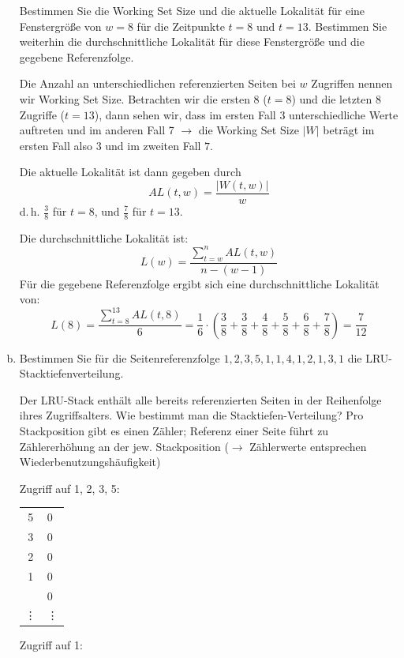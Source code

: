 \begin{enumerate}[a)]
Bestimmen Sie die Working Set Size und die aktuelle Lokalität für eine Fenstergröße von \(w = 8\) für die Zeitpunkte \(t=8\) und \(t=13\).
Bestimmen Sie weiterhin die durchschnittliche Lokalität für diese Fenstergröße und die gegebene Referenzfolge.

\begin{solution}
Die Anzahl an unterschiedlichen referenzierten Seiten bei $w$ Zugriffen nennen wir Working Set Size. Betrachten wir  die ersten 8 (\(t=8\)) und die letzten 8 Zugriffe (\(t=13\)), dann sehen wir, dass im ersten Fall 3 unterschiedliche Werte auftreten und im anderen Fall 7 $\rightarrow$ die Working Set Size $|W|$ beträgt im ersten Fall also $3$ und im zweiten Fall $7$.

Die aktuelle Lokalität ist dann gegeben durch	\[AL(t, w) = \frac{|W(t, w)|}{w}\] d.\,h. $\frac{3}{8}$
für \(t=8\), und $\frac{7}{8}$ für \(t=13\).

Die durchschnittliche Lokalität ist: \[L(w) = \frac{\sum_{t = w}^n AL(t, w)}{n-(w-1)}\]
Für die gegebene Referenzfolge ergibt sich eine durchschnittliche Lokalität von:
\begin{equation*}
	 L(8) = \frac{\sum_{t = 8}^{13} AL(t, 8)}{6} = \frac{1}{6} \cdot (\frac{3}{8}+\frac{3}{8}+\frac{4}{8}+\frac{5}{8}+\frac{6}{8}+\frac{7}{8}) = \frac{7}{12}
\end{equation*}

\end{solution}

    \item Bestimmen Sie für die Seitenreferenzfolge $1, 2, 3, 5, 1, 1, 4, 1, 2, 1, 3, 1$ die LRU-Stack\-tie\-fen\-ver\-tei\-lung.

\begin{solution}
Der LRU-Stack enthält alle bereits referenzierten Seiten in der Reihenfolge ihres Zugriffsalters. Wie bestimmt man die Stacktiefen-Verteilung? Pro Stackposition gibt es einen Zähler; Referenz einer Seite führt zu Zählererhöhung an der jew. Stackposition ($\rightarrow$ Zählerwerte entsprechen Wiederbenutzungshäufigkeit)


    \begin{minipage}{0.28\textwidth}
        \center
        Zugriff auf 1, 2, 3, 5:

        \begin{tabular}{ | c | l}
        	\cline{1-1}
        	5      & 0      \\ \cline{1-1}
        	3      & 0      \\ \cline{1-1}
        	2      & 0      \\ \cline{1-1}
        	1      & 0      \\ \cline{1-1}
        	       & 0      \\ \cline{1-1}
        	\vdots & \vdots \\ \cline{1-1}
        \end{tabular}
    \end{minipage}
    \begin{minipage}{0.22\textwidth}
        \center
        Zugriff auf 1:


\end{minipage}
\end{solution}
\end{enumerate}
